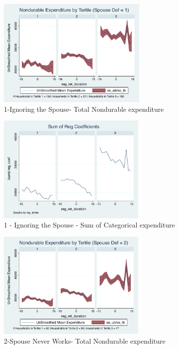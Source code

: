 \documentclass[11pt,onecolumn]{article}
\numberwithin{figure}{section}
\begin{document}
\begin{figure}[h]
	\caption{1-Ignoring the Spouse- Total Nondurable expenditure}
	\centering
	\includegraphics[width=0.655\textwidth]{../ConsumptionPostRetirement_by_SpouseDef/UnSmoothed/spouse_def_1.pdf}
\end{figure}
\clearpage

\begin{figure}
	\caption{1 - Ignoring the Spouse - Sum of Categorical expenditure}
	\centering
	\includegraphics[width=0.65\textwidth]{../ConsumptionPostRetirement_by_SpouseDef_Cats/SumCoef/spouse_def_1.pdf}
\end{figure}

\begin{figure}[h]
	\caption{2-Spouse Never Works- Total Nondurable expenditure}
	\centering
	\includegraphics[width=0.65\textwidth]{../ConsumptionPostRetirement_by_SpouseDef/UnSmoothed/spouse_def_2.pdf}
\end{figure}
\end{document}
